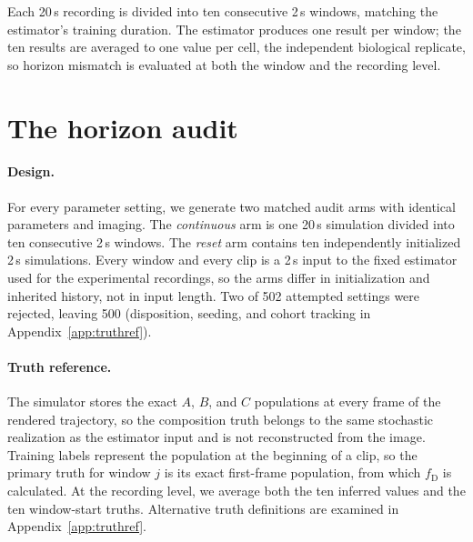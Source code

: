 \documentclass{article}
\newcommand{\fD}{f_{\mathrm{D}}}
\begin{document}
Each 20\,s recording is divided into ten consecutive 2\,s windows, matching
the estimator's training duration. The estimator produces one result per
window; the ten results are averaged to one value per cell, the independent
biological replicate, so horizon mismatch is evaluated at both the window and
the recording level.

\section{The horizon audit}
\label{sec:design}

\paragraph{Design.} For every parameter setting, we generate two matched
audit arms with identical parameters and imaging. The \emph{continuous} arm
is one 20\,s simulation divided into ten consecutive 2\,s windows. The \emph{reset} arm contains ten independently initialized 2\,s simulations.
Every window and every clip is a 2\,s input to the fixed estimator used for
the experimental recordings, so the arms differ in initialization and
inherited history, not in input length. Two of 502 attempted settings were rejected, leaving 500
(disposition, seeding, and cohort tracking in Appendix~\ref{app:truthref}).

\paragraph{Truth reference.} The simulator stores the exact $A$, $B$, and
$C$ populations at every frame of the rendered trajectory, so the composition
truth belongs to the same stochastic realization as the estimator input and is
not reconstructed from the image. Training
labels represent the population at the beginning of a clip, so the primary
truth for window $j$ is its exact first-frame population, from which $\fD$ is
calculated. At the recording level, we average both the ten inferred values
and the ten window-start truths. Alternative truth definitions are examined
in Appendix~\ref{app:truthref}.
\end{document}
